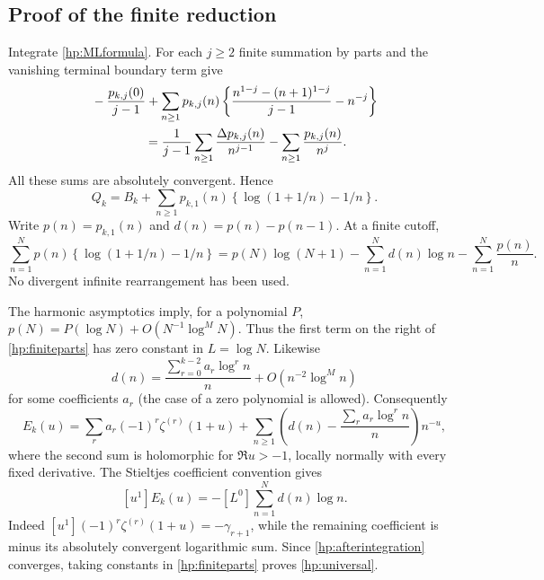 \documentclass[11pt]{article}
\numberwithin{equation}{section}
\theoremstyle{plain}
\theoremstyle{definition}
\theoremstyle{remark}
\begin{document}
\subsection{Proof of the finite reduction}

Integrate \eqref{hp:MLformula}. For each $j\ge2$ finite summation by
parts and the vanishing terminal boundary term give
\begin{align*}
 &-\frac{p_{k,j}(0)}{j-1}
   +\sum_{n\ge1}p_{k,j}(n)
       \left\{\frac{n^{1-j}-(n+1)^{1-j}}{j-1}-n^{-j}\right\}\\
 &\hspace{15mm}=
   \frac1{j-1}\sum_{n\ge1}\frac{\Delta p_{k,j}(n)}{n^{j-1}}
         -\sum_{n\ge1}\frac{p_{k,j}(n)}{n^j}.
\end{align*}
All these sums are absolutely convergent. Hence
\begin{equation}\label{hp:afterintegration}
 Q_k=B_k+\sum_{n\ge1}p_{k,1}(n)
             \left\{\log(1+1/n)-1/n\right\}.
\end{equation}
Write $p(n)=p_{k,1}(n)$ and $d(n)=p(n)-p(n-1)$. At a finite cutoff,
\begin{equation}\label{hp:finiteparts}
 \sum_{n=1}^Np(n)\left\{\log(1+1/n)-1/n\right\}
 =p(N)\log(N+1)-\sum_{n=1}^Nd(n)\log n
                         -\sum_{n=1}^N\frac{p(n)}n.
\end{equation}
No divergent infinite rearrangement has been used.

The harmonic asymptotics imply, for a polynomial $P$,
$p(N)=P(\log N)+O(N^{-1}\log^M N)$. Thus the first term on the
right of \eqref{hp:finiteparts} has zero constant in $L=\log N$.
Likewise
\begin{equation}\label{hp:Dasym}
 d(n)=\frac{\sum_{r=0}^{k-2}a_r\log^r n}{n}
            +O(n^{-2}\log^M n)
\end{equation}
for some coefficients $a_r$ (the case of a zero polynomial is allowed).
Consequently
\[
 E_k(u)=\sum_ra_r(-1)^r\zeta^{(r)}(1+u)
   +\sum_{n\ge1}\left(d(n)-\frac{\sum_ra_r\log^r n}{n}\right)n^{-u},
\]
where the second sum is holomorphic for $\Re u>-1$, locally normally
with every fixed derivative. The Stieltjes coefficient convention gives
\begin{equation}\label{hp:coefficientconstant}
 [u^1]E_k(u)=-[L^0]\sum_{n=1}^Nd(n)\log n.
\end{equation}
Indeed $[u^1](-1)^r\zeta^{(r)}(1+u)=-\gamma_{r+1}$, while the
remaining coefficient is minus its absolutely convergent logarithmic
sum. Since \eqref{hp:afterintegration} converges, taking constants in
\eqref{hp:finiteparts} proves \eqref{hp:universal}.
\end{document}
